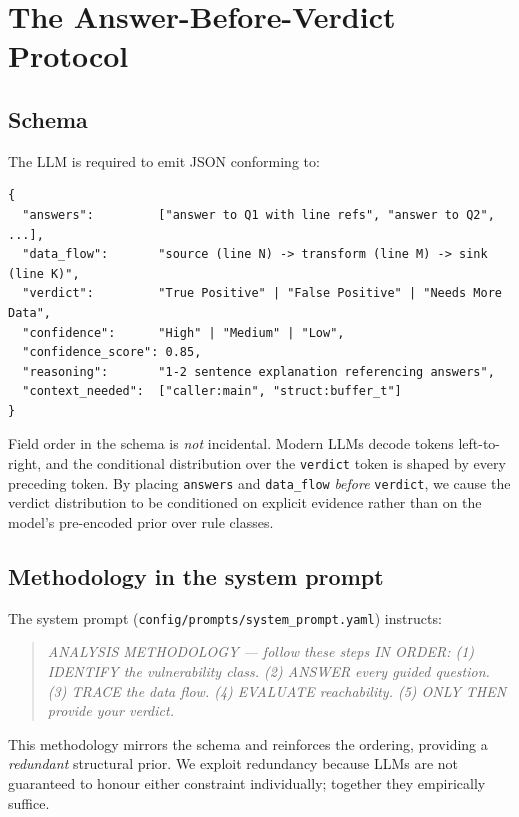\documentclass[11pt,a4paper]{article}
\begin{document}
\section{The Answer-Before-Verdict Protocol}
\label{sec:protocol}

\subsection{Schema}

The LLM is required to emit JSON conforming to:

\begin{lstlisting}[language=jsonex]
{
  "answers":         ["answer to Q1 with line refs", "answer to Q2", ...],
  "data_flow":       "source (line N) -> transform (line M) -> sink (line K)",
  "verdict":         "True Positive" | "False Positive" | "Needs More Data",
  "confidence":      "High" | "Medium" | "Low",
  "confidence_score": 0.85,
  "reasoning":       "1-2 sentence explanation referencing answers",
  "context_needed":  ["caller:main", "struct:buffer_t"]
}
\end{lstlisting}

Field order in the schema is \emph{not} incidental. Modern LLMs decode
tokens left-to-right, and the conditional distribution over the
\texttt{verdict} token is shaped by every preceding token. By placing
\texttt{answers} and \texttt{data\_flow} \emph{before} \texttt{verdict},
we cause the verdict distribution to be conditioned on explicit
evidence rather than on the model's pre-encoded prior over rule classes.

\subsection{Methodology in the system prompt}

The system prompt (\texttt{config/prompts/system\_prompt.yaml})
instructs:

\begin{quote}
\emph{ANALYSIS METHODOLOGY --- follow these steps IN ORDER:
(1) IDENTIFY the vulnerability class. (2) ANSWER every guided question.
(3) TRACE the data flow. (4) EVALUATE reachability. (5) ONLY THEN
provide your verdict.}
\end{quote}

This methodology mirrors the schema and reinforces the ordering,
providing a \emph{redundant} structural prior. We exploit redundancy
because LLMs are not guaranteed to honour either constraint
individually; together they empirically suffice.
\end{document}
